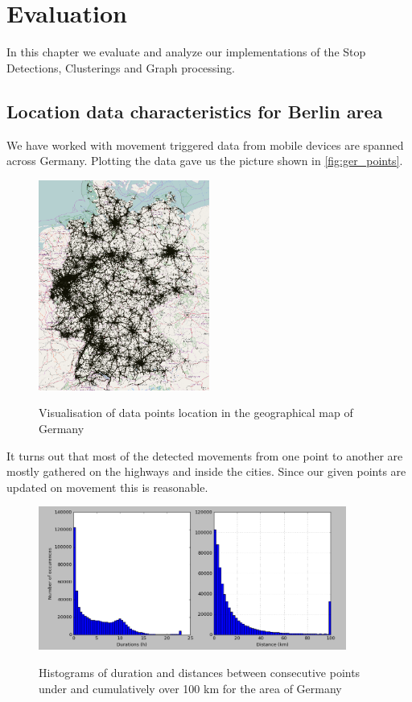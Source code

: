 
\chapter{Evaluation}
\label{cha:evaluation}
 
In this chapter we evaluate and analyze our implementations of the Stop Detections, Clusterings and Graph processing. 
 
\section{Location data characteristics for Berlin area}

We have worked with movement triggered data from mobile devices are spanned across Germany. Plotting the data gave us the picture shown in \autoref{fig:ger_points}.

\begin{figure}[!ht]
	\centering
	\includegraphics[width=0.5\textwidth]{images/points_germany.png}\\
	\caption{Visualisation of data points location in the geographical map of Germany}
	\label{fig:ger_points}
\end{figure}
\FloatBarrier

It turns out that most of the detected movements from one point to another are mostly gathered on the highways and inside the cities. Since our given points are updated on movement this is reasonable.  

\begin{figure}[!ht]
	\centering
	\includegraphics[width=0.9\textwidth]{images/germany_stats.png}\\
	\caption{Histograms of duration and distances between consecutive points under and cumulatively over 100 km for the area of Germany}
	\label{fig:ger_stats}
\end{figure}
\FloatBarrier

